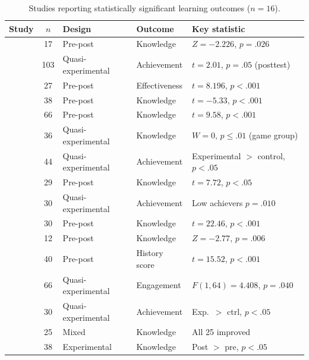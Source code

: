 \documentclass[a4paper,fleqn]{cas-sc}
\begin{document}
\begin{table}
\caption{Studies reporting statistically significant learning outcomes ($n=16$).}
\label{tab:significant_results}
	\begin{tabular}{|l|c|l|l|l|}
\hline
\hfill \textbf{Study} & \textbf{$n$} & \hfill \textbf{Design} & \hfill \textbf{Outcome} & \hfill \textbf{Key statistic} \\ \hline
\citet{1Barbatsis201159} & 17 & Pre-post & Knowledge & $Z=-2.226$, $p=.026$ \\ \hline
\citet{8Yu2014} & 103 & Quasi-experimental & Achievement & $t=2.01$, $p=.05$ (posttest) \\ \hline
\citet{9Lin2018} & 27 & Pre-post & Effectiveness & $t=8.196$, $p<.001$ \\ \hline
\citet{16Chen201447} & 38 & Pre-post & Knowledge & $t=-5.33$, $p<.001$ \\ \hline
\citet{19Chou2019} & 66 & Pre-post & Knowledge & $t=9.58$, $p<.001$ \\ \hline
\citet{24Ghannem2019} & 36 & Quasi-experimental & Knowledge & $W=0$, $p\leq.01$ (game group) \\ \hline
\citet{28Chao201734} & 44 & Quasi-experimental & Achievement & Experimental $>$ control, $p<.05$ \\ \hline
\citet{45Yu2016727} & 29 & Pre-post & Knowledge & $t=7.72$, $p<.05$ \\ \hline
\citet{52Lin2011265} & 30 & Quasi-experimental & Achievement & Low achievers $p=.010$ \\ \hline
\citet{58Shih2015173} & 30 & Pre-post & Knowledge & $t=22.46$, $p<.001$ \\ \hline
\citet{63Liu2021} & 12 & Pre-post & Knowledge & $Z=-2.77$, $p=.006$ \\ \hline
\citet{64Hsu201324} & 40 & Pre-post & History score & $t=15.52$, $p<.001$ \\ \hline
\citet{66Rahmawati2023163} & 66 & Quasi-experimental & Engagement & $F(1,64)=4.408$, $p=.040$ \\ \hline
\citet{67Lin201296} & 30 & Quasi-experimental & Achievement & Exp.\ $>$ ctrl, $p<.05$ \\ \hline
\citet{71lynch2015pedagogical} & 25 & Mixed & Knowledge & All 25 improved \\ \hline
\citet{79Fernes2024379} & 38 & Experimental & Knowledge & Post $>$ pre, $p<.05$ \\ \hline
	\end{tabular}

\end{table}
\end{document}
